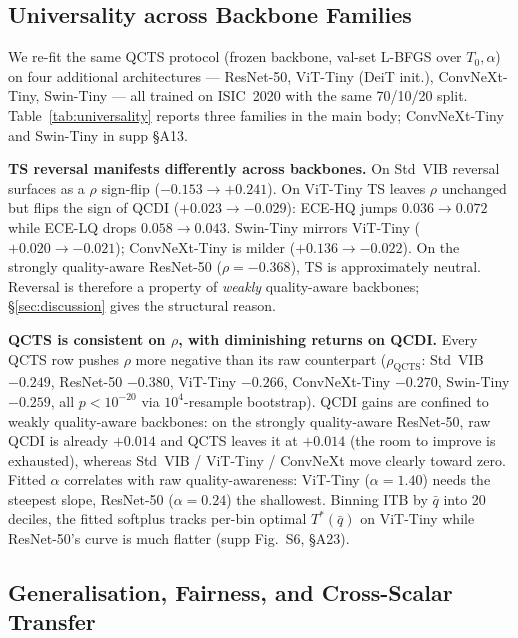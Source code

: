 \documentclass{bmvc2k}
\begin{document}
\subsection{Universality across Backbone Families}
\label{sec:universality}

We re-fit the same QCTS protocol (frozen backbone, val-set L-BFGS over $T_0, \alpha$) on four additional architectures --- ResNet-50, ViT-Tiny (DeiT init.), ConvNeXt-Tiny, Swin-Tiny --- all trained on ISIC~2020 with the same 70/10/20 split. Table~\ref{tab:universality} reports three families in the main body; ConvNeXt-Tiny and Swin-Tiny in supp \S A13.

\textbf{TS reversal manifests differently across backbones.}
On Std~VIB reversal surfaces as a $\rho$ sign-flip ($-0.153\to+0.241$). On ViT-Tiny TS leaves $\rho$ unchanged but flips the sign of QCDI ($+0.023\to-0.029$): ECE-HQ jumps $0.036\to0.072$ while ECE-LQ drops $0.058\to0.043$. Swin-Tiny mirrors ViT-Tiny ($+0.020\to-0.021$); ConvNeXt-Tiny is milder ($+0.136\to-0.022$). On the strongly quality-aware ResNet-50 ($\rho{=}-0.368$), TS is approximately neutral. Reversal is therefore a property of \emph{weakly} quality-aware backbones; \S\ref{sec:discussion} gives the structural reason.

\textbf{QCTS is consistent on $\rho$, with diminishing returns on QCDI.}
Every QCTS row pushes $\rho$ more negative than its raw counterpart ($\rho_\text{QCTS}$: Std~VIB $-0.249$, ResNet-50 $-0.380$, ViT-Tiny $-0.266$, ConvNeXt-Tiny $-0.270$, Swin-Tiny $-0.259$, all $p{<}10^{-20}$ via $10^4$-resample bootstrap). QCDI gains are confined to weakly quality-aware backbones: on the strongly quality-aware ResNet-50, raw QCDI is already $+0.014$ and QCTS leaves it at $+0.014$ (the room to improve is exhausted), whereas Std~VIB / ViT-Tiny / ConvNeXt move clearly toward zero. Fitted $\alpha$ correlates with raw quality-awareness: ViT-Tiny ($\alpha{=}1.40$) needs the steepest slope, ResNet-50 ($\alpha{=}0.24$) the shallowest. Binning ITB by $\bar q$ into 20 deciles, the fitted softplus tracks per-bin optimal $T^*(\bar q)$ on ViT-Tiny while ResNet-50's curve is much flatter (supp Fig.~S6, \S A23).



\subsection{Generalisation, Fairness, and Cross-Scalar Transfer}
\label{sec:generalisation}
\end{document}
